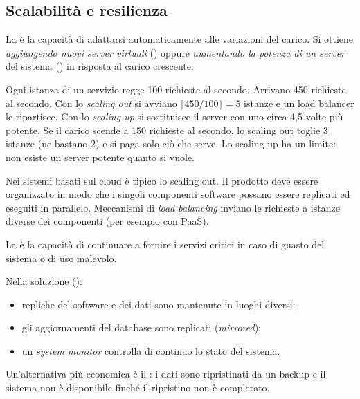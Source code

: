 \subsection{Scalabilità e resilienza}
\label{sec:cloud-scal}

\begin{definizione}[Scalability]
La  è la capacità di adattarsi automaticamente alle variazioni del carico. Si ottiene
\emph{aggiungendo nuovi server virtuali} () oppure \emph{aumentando la potenza di un server} del sistema
() in risposta al carico crescente.
\end{definizione}

\begin{esempio}
Ogni istanza di un servizio regge 100 richieste al secondo. Arrivano 450 richieste al secondo. Con lo
\emph{scaling out} si avviano $\lceil 450/100 \rceil = 5$ istanze e un load balancer le ripartisce. Con lo
\emph{scaling up} si sostituisce il server con uno circa 4,5 volte più potente. Se il carico scende a 150 richieste al
secondo, lo scaling out toglie 3 istanze (ne bastano 2) e si paga solo ciò che serve. Lo scaling up ha un limite: non
esiste un server potente quanto si vuole.
\end{esempio}

Nei sistemi basati sul cloud è tipico lo scaling out. Il prodotto deve essere organizzato in modo che i singoli
componenti software possano essere replicati ed eseguiti in parallelo. Meccanismi di \emph{load balancing} inviano le
richieste a istanze diverse dei componenti (per esempio con PaaS).

\begin{definizione}[Resilience]
La  è la capacità di continuare a fornire i servizi critici in caso di guasto del sistema o di uso
malevolo.
\end{definizione}

Nella soluzione  ():
\begin{itemize}
  \item repliche del software e dei dati sono mantenute in luoghi diversi;
  \item gli aggiornamenti del database sono replicati (\emph{mirrored});
  \item un \emph{system monitor} controlla di continuo lo stato del sistema.
\end{itemize}
Un'alternativa più economica è il : i dati sono ripristinati da un backup e il sistema non è
disponibile finché il ripristino non è completato.

